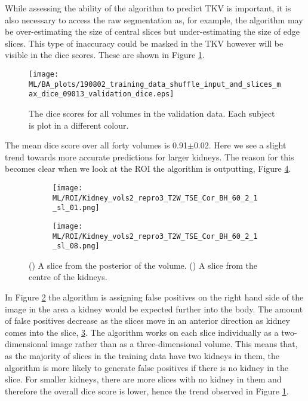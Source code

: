 While assessing the ability of the algorithm to predict \ac{TKV} is important, it is also necessary to access the raw segmentation as, for example, the algorithm may be over-estimating the size of central slices but under-estimating the size of edge slices. This type of inaccuracy could be masked in the \ac{TKV} however will be visible in the dice scores. These are shown in Figure \ref{fig:ml_validation_dice}.

\begin{figure}[H]
	\centering
	\texttt{[image: ML/BA\_plots/190802\_training\_data\_shuffle\_input\_and\_slices\_max\_dice\_09013\_validation\_dice.eps]}
	\caption{The dice scores for all volumes in the validation data. Each subject is plot in a different colour.}
	\label{fig:ml_validation_dice}
\end{figure}

The mean dice score over all forty volumes is 0.91$\pm$0.02. Here we see a slight trend towards more accurate predictions for larger kidneys. The reason for this becomes clear when we look at the \ac{ROI} the algorithm is outputting, Figure \ref{fig:ml_roi}.

\begin{figure}[H]
	\centering
	\begin{subfigure}[c]{0.47\textwidth}
		\centering
		\texttt{[image: ML/ROI/Kidney\_vols2\_repro3\_T2W\_TSE\_Cor\_BH\_60\_2\_1\_sl\_01.png]}
		\caption{}
		\label{fig:ml_roi_outside}
	\end{subfigure}
	\hfill
	\begin{subfigure}[c]{0.47\textwidth}
		\centering
		\texttt{[image: ML/ROI/Kidney\_vols2\_repro3\_T2W\_TSE\_Cor\_BH\_60\_2\_1\_sl\_08.png]}
		\caption{}
		\label{fig:ml_roi_inside}
	\end{subfigure}
	\caption{() A slice from the posterior of the volume. () A slice from the centre of the kidneys.}
	\label{fig:ml_roi}
\end{figure}

In Figure \ref{fig:ml_roi_outside} the algorithm is assigning false positives on the right hand side of the image in the area a kidney would be expected further into the body. The amount of false positives decrease as the slices move in an anterior direction as kidney comes into the slice, \ref{fig:ml_roi_inside}. The algorithm works on each slice individually as a two-dimensional image rather than as a three-dimensional volume. This means that, as the majority of slices in the training data have two kidneys in them, the algorithm is more likely to generate false positives if there is no kidney in the slice. For smaller kidneys, there are more slices with no kidney in them and therefore the overall dice score is lower, hence the trend observed in Figure \ref{fig:ml_validation_dice}.\\

